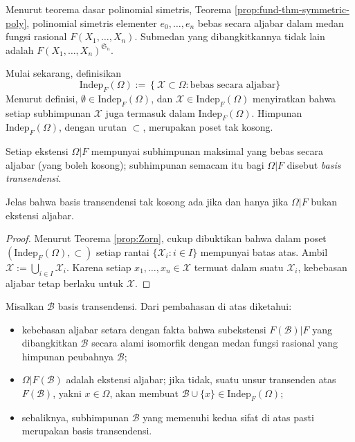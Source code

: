 \begin{example}
	Menurut teorema dasar polinomial simetris, Teorema \ref{prop:fund-thm-symmetric-poly}, polinomial simetris elementer $e_0, \ldots, e_n$ bebas secara aljabar dalam medan fungsi rasional $F(X_1, \ldots, X_n)$. Submedan yang dibangkitkannya tidak lain adalah $F(X_1, \ldots, X_n)^{\mathfrak{S}_n}$.
\end{example}

Mulai sekarang, definisikan
\[ \text{Indep}_F(\Omega) := \left\{ \mathcal{X} \subset \Omega: \text{bebas secara aljabar} \}\right. \]
Menurut definisi, $\emptyset \in \text{Indep}_F(\Omega)$, dan $\mathcal{X} \in \text{Indep}_F(\Omega)$ menyiratkan bahwa setiap subhimpunan $\mathcal{X}$ juga termasuk dalam $\text{Indep}_F(\Omega)$. Himpunan $\text{Indep}_F(\Omega)$, dengan urutan $\subset$, merupakan poset tak kosong.

\begin{definition-theorem}
	Setiap ekstensi $\Omega|F$ mempunyai subhimpunan maksimal yang bebas secara aljabar (yang boleh kosong); subhimpunan semacam itu bagi $\Omega|F$ disebut \emph{basis transendensi}.
\end{definition-theorem}
Jelas bahwa basis transendensi tak kosong ada jika dan hanya jika $\Omega|F$ bukan ekstensi aljabar.
\begin{proof}
	Menurut Teorema \ref{prop:Zorn}, cukup dibuktikan bahwa dalam poset $(\text{Indep}_F(\Omega), \subset)$ setiap rantai $\{ \mathcal{X}_i: i \in I\}$ mempunyai batas atas. Ambil $\mathcal{X} := \bigcup_{i \in I} \mathcal{X}_i$. Karena setiap $x_1, \ldots, x_n \in \mathcal{X}$ termuat dalam suatu $\mathcal{X}_i$, kebebasan aljabar tetap berlaku untuk $\mathcal{X}$.
\end{proof}

Misalkan $\mathcal{B}$ basis transendensi. Dari pembahasan di atas diketahui:
\begin{itemize}
	\item kebebasan aljabar setara dengan fakta bahwa subekstensi $F(\mathcal{B})|F$ yang dibangkitkan $\mathcal{B}$ secara alami isomorfik dengan medan fungsi rasional yang himpunan peubahnya $\mathcal{B}$;
	\item $\Omega|F(\mathcal{B})$ adalah ekstensi aljabar; jika tidak, suatu unsur transenden atas $F(\mathcal{B})$, yakni $x \in \Omega$, akan membuat $\mathcal{B} \cup \{x\} \in \text{Indep}_F(\Omega)$;
	\item sebaliknya, subhimpunan $\mathcal{B}$ yang memenuhi kedua sifat di atas pasti merupakan basis transendensi.
\end{itemize}

